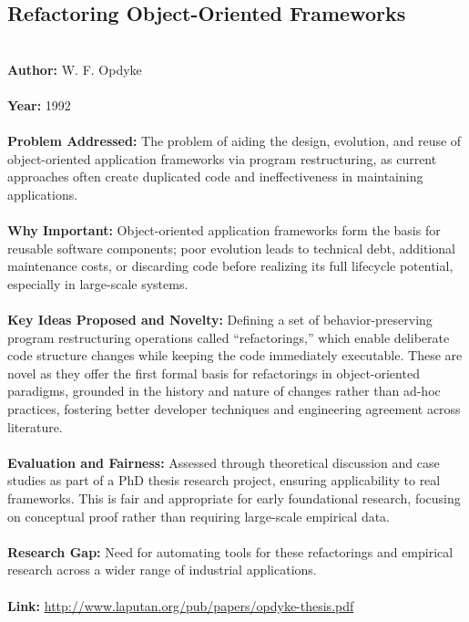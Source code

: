 \documentclass[12pt]{article}
\begin{document}
\subsection*{Refactoring Object-Oriented Frameworks}
\\
\textbf{Author:} W. F. Opdyke \\
\\
\textbf{Year:} 1992 \\
\\
\textbf{Problem Addressed:} The problem of aiding the design, evolution, and reuse of object-oriented application frameworks via program restructuring, as current approaches often create duplicated code and ineffectiveness in maintaining applications. \\
\\
\textbf{Why Important:} Object-oriented application frameworks form the basis for reusable software components; poor evolution leads to technical debt, additional maintenance costs, or discarding code before realizing its full lifecycle potential, especially in large-scale systems. \\
\\
\textbf{Key Ideas Proposed and Novelty:} Defining a set of behavior-preserving program restructuring operations called ``refactorings,'' which enable deliberate code structure changes while keeping the code immediately executable. These are novel as they offer the first formal basis for refactorings in object-oriented paradigms, grounded in the history and nature of changes rather than ad-hoc practices, fostering better developer techniques and engineering agreement across literature. \\
\\
\textbf{Evaluation and Fairness:} Assessed through theoretical discussion and case studies as part of a PhD thesis research project, ensuring applicability to real frameworks. This is fair and appropriate for early foundational research, focusing on conceptual proof rather than requiring large-scale empirical data. \\
\\
\textbf{Research Gap:} Need for automating tools for these refactorings and empirical research across a wider range of industrial applications. \\
\\
\textbf{Link:} \url{http://www.laputan.org/pub/papers/opdyke-thesis.pdf}
\pagebreak


\end{document}
